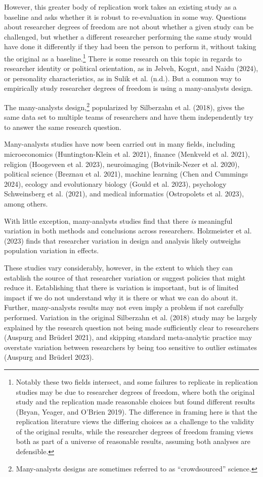 \documentclass[
  letterpaper,
  DIV=11,
  numbers=noendperiod]{scrartcl}
\begin{document}
However, this greater body of replication work takes an existing study
as a baseline and asks whether it is robust to re-evaluation in some
way. Questions about researcher degrees of freedom are not about whether
a given study can be challenged, but whether a different researcher
performing the same study would have done it differently if they had
been the person to perform it, without taking the original as a
baseline.\footnote{Notably these two fields intersect, and some failures
  to replicate in replication studies may be due to researcher degrees
  of freedom, where both the original study and the replication made
  reasonable choices but found different results (Bryan, Yeager, and
  O'Brien 2019). The difference in framing here is that the replication
  literature views the differing choices as a challenge to the validity
  of the original results, while the researcher degrees of freedom
  framing views both as part of a universe of reasonable results,
  assuming both analyses are defensible.} There is some research on this
topic in regards to researcher identity or political orientation, as in
Jelveh, Kogut, and Naidu (2024), or personality characteristics, as in
Sulik et al. (n.d.). But a common way to empirically study researcher
degrees of freedom is using a many-analysts design.

The many-analysts design,\footnote{Many-analysts designs are sometimes
  referred to as ``crowdsourced'' science.} popularized by Silberzahn et
al. (2018), gives the same data set to multiple teams of researchers and
have them independently try to answer the same research question.

Many-analysts studies have now been carried out in many fields,
including microeconomics (Huntington-Klein et al. 2021), finance
(Menkveld et al. 2021), religion (Hoogeveen et al. 2023), neuroimaging
(Botvinik-Nezer et al. 2020), political science (Breznau et al. 2021),
machine learning (Chen and Cummings 2024), ecology and evolutionary
biology (Gould et al. 2023), psychology Schweinsberg et al. (2021), and
medical informatics (Ostropolets et al. 2023), among others.

With little exception, many-analysts studies find that there \emph{is}
meaningful variation in both methods and conclusions across researchers.
Holzmeister et al. (2023) finds that researcher variation in design and
analysis likely outweighs population variation in effects.

These studies vary considerably, however, in the extent to which they
can establish the source of that researcher variation or suggest
policies that might reduce it. Establishing that there is variation is
important, but is of limited impact if we do not understand why it is
there or what we can do about it. Further, many-analysts results may not
even imply a problem if not carefully performed. Variation in the
original Silberzahn et al. (2018) study may be largely explained by the
research question not being made sufficiently clear to researchers
(Auspurg and Brüderl 2021), and skipping standard meta-analytic practice
may overstate variation between researchers by being too sensitive to
outlier estimates (Auspurg and Brüderl 2023).
\end{document}
